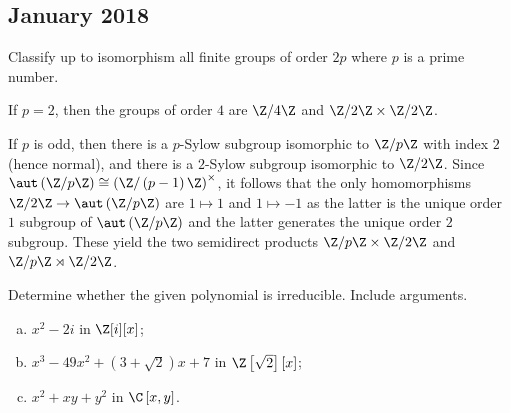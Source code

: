 \documentclass[10pt]{mypackage}
\begin{document}
\subsection{January 2018}%
\begin{problem}[Problem 1]
  Classify up to isomorphism all finite groups of order $2p$ where $p$ is a prime number.
\end{problem}
\begin{solution}
  If $p = 2$, then the groups of order $4$ are $\Z/4\Z$ and $\Z/2\Z\times \Z/2\Z$.

  If $p$ is odd, then there is a $p$-Sylow subgroup isomorphic to $\Z/p\Z$ with index $2$ (hence normal), and there is a $2$-Sylow subgroup isomorphic to $\Z/2\Z$. Since $\aut\left( \Z/p\Z \right)\cong \left( \Z/\left( p-1 \right)\Z \right)^{\times}$, it follows that the only homomorphisms $\Z/2\Z\rightarrow \aut\left( \Z/p\Z \right)$ are $1\mapsto 1$ and $1\mapsto -1$ as the latter is the unique order $1$ subgroup of $\aut\left( \Z/p\Z \right)$ and the latter generates the unique order $2$ subgroup. These yield the two semidirect products $\Z/p\Z\times \Z/2\Z$ and $\Z/p\Z\rtimes \Z/2\Z$.
\end{solution}
\begin{problem}[Problem 3]
  Determine whether the given polynomial is irreducible. Include arguments.
  \begin{enumerate}[(a)]
    \item $x^2 - 2i$ in $\Z[i][x]$;
    \item $x^3 - 49x^2 + \left( 3 + \sqrt{2} \right)x + 7$ in $\Z\left[ \sqrt{2} \right]\left[ x \right]$;
    \item $x^2 + xy + y^2$ in $\C\left[ x,y \right]$.
  \end{enumerate}
\end{problem}
\end{document}
